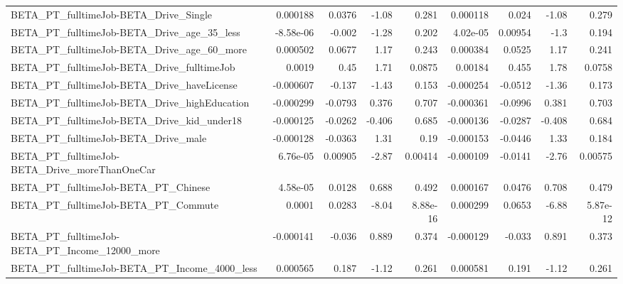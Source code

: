\begin{tabular}{lrrrrrrrr}
BETA\_PT\_fulltimeJob-BETA\_Drive\_Single              &    0.000188 &       0.0376 &     -1.08 &    0.281 &   0.000118 &       0.024 &        -1.08 &         0.279 \\
BETA\_PT\_fulltimeJob-BETA\_Drive\_age\_35\_less         &   -8.58e-06 &       -0.002 &     -1.28 &    0.202 &   4.02e-05 &     0.00954 &         -1.3 &         0.194 \\
BETA\_PT\_fulltimeJob-BETA\_Drive\_age\_60\_more         &    0.000502 &       0.0677 &      1.17 &    0.243 &   0.000384 &      0.0525 &         1.17 &         0.241 \\
BETA\_PT\_fulltimeJob-BETA\_Drive\_fulltimeJob         &      0.0019 &         0.45 &      1.71 &   0.0875 &    0.00184 &       0.455 &         1.78 &        0.0758 \\
BETA\_PT\_fulltimeJob-BETA\_Drive\_haveLicense         &   -0.000607 &       -0.137 &     -1.43 &    0.153 &  -0.000254 &     -0.0512 &        -1.36 &         0.173 \\
BETA\_PT\_fulltimeJob-BETA\_Drive\_highEducation       &   -0.000299 &      -0.0793 &     0.376 &    0.707 &  -0.000361 &     -0.0996 &        0.381 &         0.703 \\
BETA\_PT\_fulltimeJob-BETA\_Drive\_kid\_under18         &   -0.000125 &      -0.0262 &    -0.406 &    0.685 &  -0.000136 &     -0.0287 &       -0.408 &         0.684 \\
BETA\_PT\_fulltimeJob-BETA\_Drive\_male                &   -0.000128 &      -0.0363 &      1.31 &     0.19 &  -0.000153 &     -0.0446 &         1.33 &         0.184 \\
BETA\_PT\_fulltimeJob-BETA\_Drive\_moreThanOneCar      &    6.76e-05 &      0.00905 &     -2.87 &  0.00414 &  -0.000109 &     -0.0141 &        -2.76 &       0.00575 \\
BETA\_PT\_fulltimeJob-BETA\_PT\_Chinese                &    4.58e-05 &       0.0128 &     0.688 &    0.492 &   0.000167 &      0.0476 &        0.708 &         0.479 \\
BETA\_PT\_fulltimeJob-BETA\_PT\_Commute                &      0.0001 &       0.0283 &     -8.04 & 8.88e-16 &   0.000299 &      0.0653 &        -6.88 &      5.87e-12 \\
BETA\_PT\_fulltimeJob-BETA\_PT\_Income\_12000\_more      &   -0.000141 &       -0.036 &     0.889 &    0.374 &  -0.000129 &      -0.033 &        0.891 &         0.373 \\
BETA\_PT\_fulltimeJob-BETA\_PT\_Income\_4000\_less       &    0.000565 &        0.187 &     -1.12 &    0.261 &   0.000581 &       0.191 &        -1.12 &         0.261 \\

\end{tabular}
